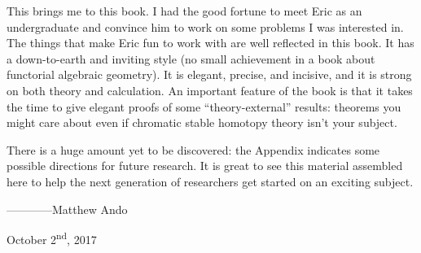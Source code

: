 This brings me to this book.  I had the good fortune to meet
Eric as an undergraduate and convince him to work on some problems I
was interested in. The things that make Eric fun to work with are
well reflected in this book.  It has a down-to-earth and inviting
style (no small achievement in a book about 
functorial algebraic geometry).  It is elegant,
precise, and incisive, and it is strong on both theory and
calculation.  An important feature of the book is that it takes the
time to give elegant proofs of some ``theory-external'' results:
theorems you might care about even if chromatic stable homotopy theory isn't
your subject.  

There is a huge amount yet to be discovered: the Appendix indicates
some possible directions for future research.  It is great to see this
material assembled here to help the next generation of researchers get
started on an exciting subject.

\vspace{2\baselineskip}
\hspace{3em} ------------Matthew Ando

\hspace{7em} October 2\textsuperscript{nd}, 2017
